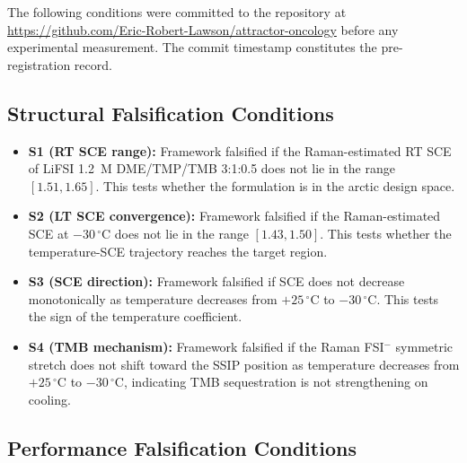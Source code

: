 \documentclass[11pt]{article}
\theoremstyle{plain}
\theoremstyle{definition}
\theoremstyle{remark}
\begin{document}
The following conditions were committed to the repository at
\url{https://github.com/Eric-Robert-Lawson/attractor-oncology}
before any experimental measurement.  The commit timestamp
constitutes the pre-registration record.

\subsection{Structural Falsification Conditions}

\begin{itemize}[leftmargin=2em]
  \item \textbf{S1 (RT SCE range):} Framework falsified if the
        Raman-estimated RT SCE of LiFSI 1.2~M DME/TMP/TMB 3:1:0.5
        does not lie in the range $[1.51, 1.65]$.  This tests
        whether the formulation is in the arctic design space.
  \item \textbf{S2 (LT SCE convergence):} Framework falsified if
        the Raman-estimated SCE at $-30\,^\circ$C does not lie in
        the range $[1.43, 1.50]$.  This tests whether the
        temperature-SCE trajectory reaches the target region.
  \item \textbf{S3 (SCE direction):} Framework falsified if SCE
        does not decrease monotonically as temperature decreases
        from $+25\,^\circ$C to $-30\,^\circ$C.  This tests the
        sign of the temperature coefficient.
  \item \textbf{S4 (TMB mechanism):} Framework falsified if the
        Raman FSI$^-$ symmetric stretch does not shift toward the
        SSIP position as temperature decreases from $+25\,^\circ$C
        to $-30\,^\circ$C, indicating TMB sequestration is not
        strengthening on cooling.
\end{itemize}

\subsection{Performance Falsification Conditions}
\end{document}
